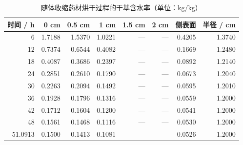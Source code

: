 \begin{table}[htbp]
\caption{随体收缩药材烘干过程的干基含水率（单位：kg/kg）}\label{tab:required-6}
\centering
\footnotesize
\begin{tabular}{rrrrrrrr}
\toprule
时间 / h & 0 cm & 0.5 cm & 1 cm & 1.5 cm & 2 cm & 侧表面 & 半径 / cm \\
\midrule
6 & 1.7188 & 1.5370 & 1.0221 & --- & --- & 0.4205 & 1.3740 \\
12 & 0.7374 & 0.6544 & 0.4082 & --- & --- & 0.1669 & 1.2480 \\
18 & 0.4087 & 0.3686 & 0.2397 & --- & --- & 0.0892 & 1.2140 \\
24 & 0.2851 & 0.2610 & 0.1790 & --- & --- & 0.0673 & 1.2040 \\
30 & 0.2263 & 0.2094 & 0.1492 & --- & --- & 0.0595 & 1.2010 \\
36 & 0.1928 & 0.1796 & 0.1316 & --- & --- & 0.0559 & 1.2000 \\
42 & 0.1712 & 0.1604 & 0.1200 & --- & --- & 0.0541 & 1.2000 \\
48 & 0.1561 & 0.1468 & 0.1116 & --- & --- & 0.0530 & 1.2000 \\
51.0913 & 0.1500 & 0.1413 & 0.1081 & --- & --- & 0.0526 & 1.2000 \\
\bottomrule
\end{tabular}
\end{table}
